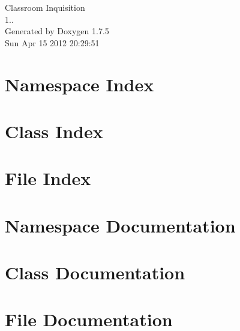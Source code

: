 \documentclass[a4paper]{book}
\begin{document}
\hypersetup{pageanchor=false,citecolor=blue}
\begin{titlepage}
\vspace*{7cm}
\begin{center}
{\Large \-Classroom \-Inquisition \\[1ex]\large 1.. }\\
\vspace*{1cm}
{\large \-Generated by Doxygen 1.7.5}\\
\vspace*{0.5cm}
{\small Sun Apr 15 2012 20:29:51}\\
\end{center}
\end{titlepage}
\clearemptydoublepage
{}
\tableofcontents
\clearemptydoublepage
{}
\hypersetup{pageanchor=true,citecolor=blue}
\chapter{\-Namespace \-Index}

\chapter{\-Class \-Index}

\chapter{\-File \-Index}

\chapter{\-Namespace \-Documentation}


\chapter{\-Class \-Documentation}






\chapter{\-File \-Documentation}
























\printindex
\end{document}
